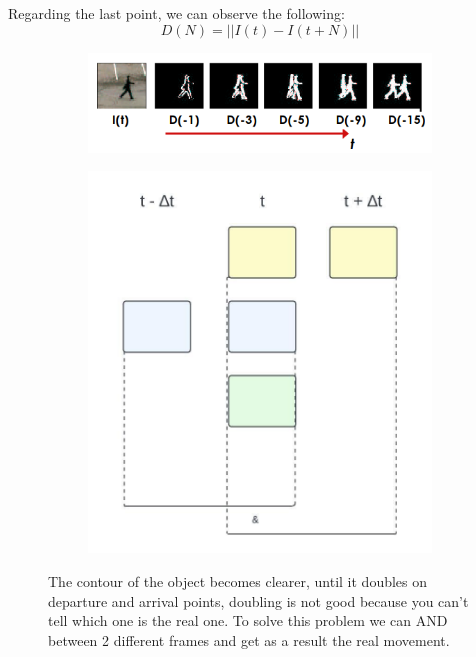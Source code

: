 Regarding the last point, we can observe the following:
\[D(N) = ||I(t)-I(t+N)||\]
\begin{figure}[H]
    \begin{subfigure}{0.6\textwidth}
        \includegraphics[scale=0.5]{Figures/FrameDifferencing.png} 
    \end{subfigure}
    \begin{subfigure}{0.4\textwidth}
        \includegraphics[scale=0.5]{Figures/DifferencingDiagram.jpeg}    \end{subfigure}
        \label{fig:image2}
    \caption{The contour of the object becomes clearer, until it doubles on departure and arrival points, doubling is not good because you can't tell which one is the real one. To solve this problem we can  AND between 2 different frames and get as a result the real movement.}
\end{figure}


